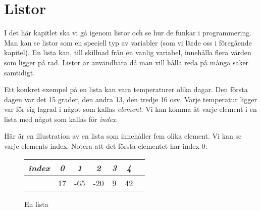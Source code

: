 %
%

\chapter{Listor}\label{ch:listor}I det här kapitlet ska vi gå igenom listor och se hur de funkar i programmering. Man kan se listor som en speciell typ av variabler (som vi lärde oss i föregående kapitel). En lista kan, till skillnad från en vanlig variabel, innehålla flera värden som ligger på rad. Listor är användbara då man vill hålla reda på många saker samtidigt.


Ett konkret exempel på en lista kan vara temperaturer olika dagar. Den första dagen var det 15 grader, den andra 13, den tredje 16 osv. Varje temperatur ligger var för sig lagrad i något som kallas \emph{element}. Vi kan komma åt varje element i en lista med något som kallas för \emph{index}.

Här är en illustration av en lista som innehåller fem olika element. Vi kan se varje elements index. Notera att det första elementet har index 0:

\begin{figure}[H]
\begin{center}
\caption{En lista}
\begin{tabular}{l|*{5}{c}r}
\emph{index} & \emph{0} & \emph{1} & \emph{2} & \emph{3} & \emph{4} \\
\hline
\emph{}       & 17 & -65 & -20 & 9 & 42  \\
\end{tabular}
\end{center}
\end{figure}

